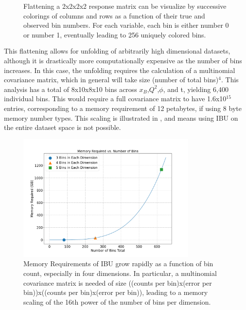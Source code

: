 \begin{figure}[H]
{            \label{fig:response_matrix_xb_q2_phi_t}}
            \caption[Flattening Map on 4D 2 Bin Example]{Flattening a 2x2x2x2 response matrix can be visualize by successive colorings of columns and rows as a function of their true and observed bin numbers. For each variable, each bin is either number 0 or number 1, eventually leading to 256 uniquely colored bins.}
            \label{fig:unrolling}
        \end{figure}
    
        
        


        This flattening allows for unfolding of arbitrarily high dimensional datasets, although it is drastically more computationally expensive as the number of bins increases. In this case, the unfolding requires the calculation of a multinomial covariance matrix, which in general will take size (number of total bins)$^4$. This analysis has a total of 8x10x8x10 bins across $x_B$,$Q^2$,$\phi$, and t, yielding 6,400 individual bins. This would require a full covariance matrix to have 1.6x10$^{15}$ entries, corresponding to a memory requirement of 12 petabytes, if using 8 byte memory number types. This scaling is illustrated in , and means using IBU on the entire dataset space is not possible. 

        \begin{figure}[ht]
            \centering
            \includegraphics[trim={0 0 0 0},clip,width=0.8\textwidth]{Chapters/Ch5-Further/0_IBU/pics/memory_required_vs_number_of_bins_in_each_dim.png}
            \caption[Memory Requirements of IBU]{Memory Requirements of IBU grow rapidly as a function of bin count, especially in four dimensions. In particular, a multinomial covariance matrix is needed of size ((counts per bin)x(error per bin))x((counts per bin)x(error per bin)), leading to a memory scaling of the 16th power of the number of bins per dimension.}
            \label{fig:ibu_mem_scale}
        \end{figure}


